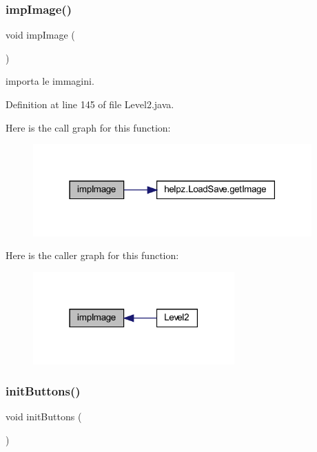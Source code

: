 \subsubsection{\texorpdfstring{imp\+Image()}{impImage()}}
{\footnotesize\ttfamily void imp\+Image (\begin{DoxyParamCaption}{ }\end{DoxyParamCaption})\hspace{0.3cm}{\ttfamily [private]}}



importa le immagini. 



Definition at line 145 of file Level2.\+java.

Here is the call graph for this function\+:
\nopagebreak
\begin{figure}[H]
\begin{center}
\leavevmode
\includegraphics[width=303pt]{classscenes_1_1_level2_aded9c531b53772fd90d09a8b6bf0132e_cgraph}
\end{center}
\end{figure}
Here is the caller graph for this function\+:\nopagebreak
\begin{figure}[H]
\begin{center}
\leavevmode
\includegraphics[width=219pt]{classscenes_1_1_level2_aded9c531b53772fd90d09a8b6bf0132e_icgraph}
\end{center}
\end{figure}
\mbox{\label{classscenes_1_1_level2_a27d3ba5afb772cc36c9a432c28975ace}} 
\subsubsection{\texorpdfstring{init\+Buttons()}{initButtons()}}
{\footnotesize\ttfamily void init\+Buttons (\begin{DoxyParamCaption}{ }\end{DoxyParamCaption})\hspace{0.3cm}{\ttfamily [private]}}




